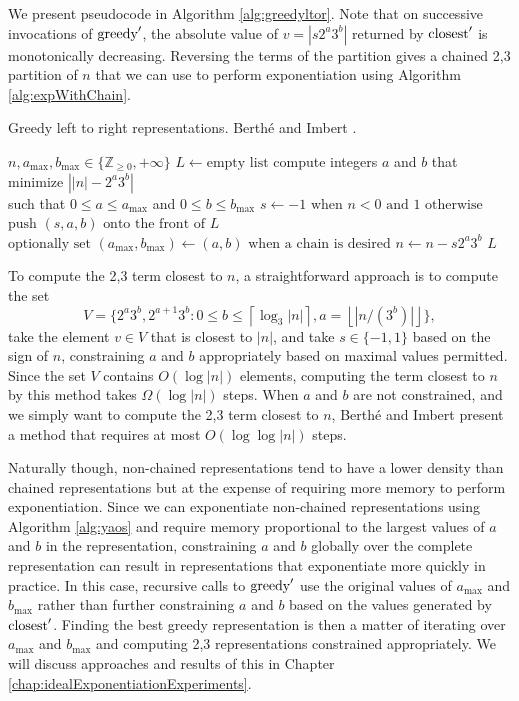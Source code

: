 \documentclass{ucalgthes1}
\theoremstyle{plain}
\theoremstyle{definition}
\newcommand{\ZZgez}{\mathbb{Z}_{\ge 0}}
\newcommand{\floor}[1]{\left\lfloor #1 \right\rfloor}
\newcommand{\ceil}[1]{\left\lceil #1 \right\rceil}
\newcommand{\amax}{a_\textrm{max}}
\newcommand{\bmax}{b_\textrm{max}}
\begin{document}
\noindent
We present pseudocode in Algorithm \ref{alg:greedyltor}. Note that on successive invocations of $\textrm{greedy}'$, the absolute value of $v=|s2^a3^b|$ returned by $\textrm{closest}'$ is monotonically decreasing.  Reversing the terms of the partition gives a chained 2,3 partition of $n$ that we can use to perform exponentiation using Algorithm \ref{alg:expWithChain}.

\begin{algorithm}[h]
\caption{Greedy left to right representations. Berth\'{e} and Imbert \cite{Berthe2009}.}
\label{alg:greedyltor}
\begin{algorithmic}[1]
\REQUIRE $n, \amax, \bmax \in \{\ZZgez, +\infty\}$ 
\STATE $L \gets \textrm{empty list}$
	\STATE compute integers $a$ and $b$ that minimize $\left||n| - 2^a3^b \right|$ \\
	       such that $0 \le a \le \amax$ and $0 \le b \le \bmax$
	\STATE $s \gets -1 \textrm{ when } n < 0 \textrm{ and } 1 \textrm{ otherwise}$
	\STATE $\textrm{push }(s, a, b) \textrm{ onto the front of } L$
	\STATE $\textrm{optionally set } (\amax, \bmax) \gets (a, b) \textrm{ when a chain is desired}$
	\STATE $n \gets n - s2^a3^b$
\ENDWHILE
\RETURN $L$
\end{algorithmic}
\end{algorithm}

To compute the 2,3 term closest to $n$, a straightforward approach is to compute the set 
\[
V = \{2^a3^b, 2^{a+1}3^b : 0 \le b \le \ceil{\log_3|n|}, a=\floor{|n/(3^b)|} \},
\]
take the element $v \in V$ that is closest to $|n|$, and take $s \in \{-1, 1\}$ based on the sign of $n$, constraining $a$ and $b$ appropriately based on maximal values permitted. Since the set $V$ contains $O(\log |n|)$ elements, computing the term closest to $n$ by this method takes $\Omega(\log |n|)$ steps.  When $a$ and $b$ are not constrained, and we simply want to compute the 2,3 term closest to $n$, Berth\'{e} and Imbert \cite{Berthe2009} present a method that requires at most $O(\log \log |n|)$ steps. 

Naturally though, non-chained representations tend to have a lower density than chained representations but at the expense of requiring more memory to perform exponentiation.  Since we can exponentiate non-chained representations using Algorithm \ref{alg:yaos} and require memory proportional to the largest values of $a$ and $b$ in the representation, constraining $a$ and $b$ globally over the complete representation can result in representations that exponentiate more quickly in practice. In this case, recursive calls to $\textrm{greedy}'$ use the original values of $\amax$ and $\bmax$ rather than further constraining $a$ and $b$ based on the values generated by $\textrm{closest}'$.  Finding the best greedy representation is then a matter of iterating over $\amax$ and $\bmax$ and computing 2,3 representations constrained appropriately.  We will discuss approaches and results of this in Chapter \ref{chap:idealExponentiationExperiments}.
\end{document}
